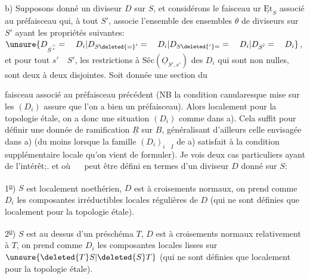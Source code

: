 b) Supposons donné un diviseur $D$ sur $S$,  et considérons le faisceau ur $\underline{\mathrm{Et}}_S$ associé au préfaisceau qui, à tout $S'$, associe l'ensemble des  ensembles   $\theta$ de diviseurs sur $S'$ ayant les propriétés suivantes: $\unsure{D_{S\overset{=}{'}}=\quad D_i|D_{S\deleted{=}'}=\quad D_i|D_{S\deleted{'}=} =\quad D_i|D_{S\bar{'}}=\quad D_i}$, et pour tout $s'\quad S'$, les restrictions  à $\text{Sêc}(\underline{O}_{S',s'})$ des $D_i$ qui sont non nulles, sont deux à deux disjointes. Soit donnée une section du

faisceau associé au préfaisceau précédent (NB la condition canularesque mise sur les $(D_i)$ assure que l'on a bien un préfaisceau). Alors localement pour la topologie étale, on a donc une situation $(D_i)$ comme dans a). Cela suffit pour définir une donnée de ramification $\underline{R}$ sur $B$, généralisant d'ailleurs celle envisagée dans a) (du moins lorsque la famille $(D_i)_{i\quad I}$ de a) satisfait à la condition supplémentaire locale qu'on vient de formuler). Je vois deux cas particuliers ayant de l'intérêt;.  et  où $\quad$ peut être défini en termes d'un diviseur $D$ donné sur $S$:

1\textsuperscript{\uline{o}}) $S$ est localement noethérien, $D$ est à croisements normaux, on prend comme $D_i$ les composantes irréductibles locales régulières de $D$ (qui ne sont définies que localement pour la topologie étale).

2\textsuperscript{\uline{o}}) $S$ est au dessus d'un préschéma $T$, $D$ est à croisements normaux relativement à $T$, on prend comme $D_i$ les composantes locales lisses sur $\unsure{\deleted{T}S|\deleted{S}T}$ (qui ne sont définies que localement pour la topologie étale).

